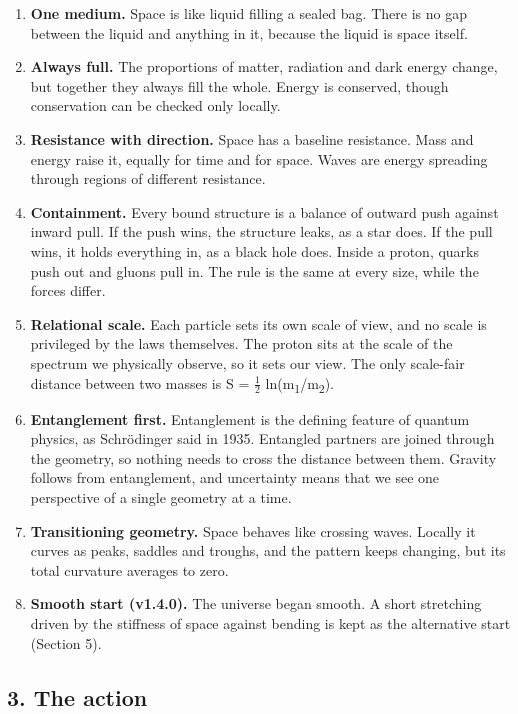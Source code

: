 \documentclass[
  11pt,
]{article}
\providecommand{\tightlist}{%
  \setlength{\itemsep}{0pt}\setlength{\parskip}{0pt}}
\begin{document}
\begin{enumerate}
\def\labelenumi{\arabic{enumi}.}
\tightlist
\item
  \textbf{One medium.} Space is like liquid filling a sealed bag. There is no gap between the liquid and anything in it, because the liquid is space itself.
\item
  \textbf{Always full.} The proportions of matter, radiation and dark energy change, but together they always fill the whole. Energy is conserved, though conservation can be checked only locally.
\item
  \textbf{Resistance with direction.} Space has a baseline resistance. Mass and energy raise it, equally for time and for space. Waves are energy spreading through regions of different resistance.
\item
  \textbf{Containment.} Every bound structure is a balance of outward push against inward pull. If the push wins, the structure leaks, as a star does. If the pull wins, it holds everything in, as a black hole does. Inside a proton, quarks push out and gluons pull in. The rule is the same at every size, while the forces differ.
\item
  \textbf{Relational scale.} Each particle sets its own scale of view, and no scale is privileged by the laws themselves. The proton sits at the scale of the spectrum we physically observe, so it sets our view. The only scale-fair distance between two masses is S = \ensuremath{\frac{1}{2}} ln(m\textsubscript{1}/m\textsubscript{2}).
\item
  \textbf{Entanglement first.} Entanglement is the defining feature of quantum physics, as Schrödinger said in 1935. Entangled partners are joined through the geometry, so nothing needs to cross the distance between them. Gravity follows from entanglement, and uncertainty means that we see one perspective of a single geometry at a time.
\item
  \textbf{Transitioning geometry.} Space behaves like crossing waves. Locally it curves as peaks, saddles and troughs, and the pattern keeps changing, but its total curvature averages to zero.
\item
  \textbf{Smooth start (v1.4.0).} The universe began smooth. A short stretching driven by the stiffness of space against bending is kept as the alternative start (Section 5).
\end{enumerate}

\hypertarget{the-action}{%
\subsection{3. The action}\label{the-action}}
\end{document}
